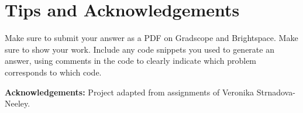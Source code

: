 \documentclass[11pt]{article}
\begin{document}
\section*{Tips and Acknowledgements}

Make sure to submit your answer as a PDF on Gradscope and Brightspace. Make sure
to show your work. Include any code snippets you used to generate an answer,
using comments in the code to clearly indicate which problem corresponds to
which code.

{\bf Acknowledgements:} Project adapted from assignments of Veronika
Strnadova-Neeley.
\end{document}
